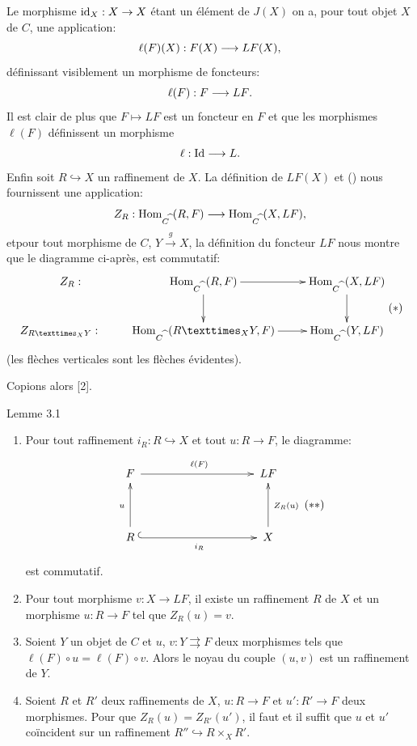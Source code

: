 \documentclass[10pt]{../fichiers-configuration-latex/smfart}
\begin{document}
Le morphisme $\operatorname{id}_X:X\rightarrow X$ étant un élément de $J(X)$
on a, pour tout objet $X$ de $C$, une application:
$$
\ell(F)(X):F(X)\longrightarrow LF(X){},
$$
définissant visiblement un morphisme de foncteurs:
$$
\ell(F):F\longrightarrow LF{}.
$$
Il est clair de plus que $F\mapsto LF$ est un foncteur en $F$ et que
les morphismes $\ell(F)$ définissent un morphisme
$$
\ell:\operatorname{Id}\longrightarrow L{}.
$$
Enfin soit $R\hookrightarrow X$ un raffinement de $X$. La
définition de $LF(X)$ et () nous fournissent une
application:
$$
Z_R:\operatorname{Hom}_{C^{\widehat{\phantom{,}}}}(R,F)\longrightarrow
\operatorname{Hom}_{C^{\widehat{\phantom{,}}}}(X,LF){},
$$
et\pageoriginale pour tout morphisme de $C$, $Y\xrightarrow{g}X$, la
définition du foncteur $LF$ nous montre que le diagramme ci-après,
est commutatif:
\[\vcenter{
\xymatrix{ \qquad Z_R :& \Hom_{C^{\widehat{\phantom{a}}}}(R,F)
\ar[r]\ar[d] &
\Hom_{C^{\widehat{\phantom{a}}}}(X,LF)\ar[d]\\
Z_{\fprod{R}{Y}{X}}:&  \Hom_{C^{\widehat{\phantom{a}}}}(\fprod{R}{Y}{X},F) \ar[r]&  \Hom_{C^{\widehat{\phantom{a}}}}(Y,LF)\\
}}\leqno{(*)}
\]
(les flèches verticales sont les flèches évidentes).

\noindent Copions alors [2].

\begin{enonce*}{Lemme 3.1}
\begin{enumerate}
\renewcommand{\labelenumi}{\theenumi)}
\item Pour tout raffinement $i_R:R\hookrightarrow X$ et tout
  $u:R\rightarrow F$, le diagramme:
\[\vcenter{
\xymatrix@L=5pt@R=1.35cm@C=3.5cm@M=.2cm{
F\ar[r]^{\ell(F)} & LF\\
R\ar[u]^{u}\ar@{^{(}->}_{i_R}[r] & X \ar[u]_{Z_R(u)} }}\leqno{(**)}
\]
est commutatif.

\item Pour tout morphisme $v:X\rightarrow LF$, il existe un
  raffinement $R$ de $X$ et un morphisme $u:R\rightarrow F$ tel que
  $Z_R(u)=v$.

\item Soient $Y$ un objet de $C$ et $u$, $v:Y\rightrightarrows F$ deux
  morphismes tels que $\ell(F)\circ u=\ell(F)\circ v$. Alors le noyau
  du couple $(u,v)$ est un raffinement de $Y$.

\item Soient $R$ et $R'$ deux raffinements de $X$, $u:R\rightarrow F$
  et $u':R'\rightarrow F$ deux morphismes. Pour que
  $Z_R(u)=Z_{R'}(u')$, il faut et il suffit que $u$ et $u'$
  co{ï}ncident sur un raffinement $R''\hookrightarrow R\times_X R'$.
\end{enumerate}
\end{enonce*}
\end{document}
